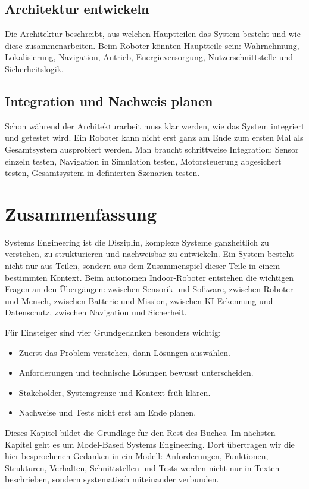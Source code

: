 \subsection{Architektur entwickeln}
Die Architektur beschreibt, aus welchen Hauptteilen das System besteht und wie diese zusammenarbeiten. Beim Roboter könnten Hauptteile sein: Wahrnehmung, Lokalisierung, Navigation, Antrieb, Energieversorgung, Nutzerschnittstelle und Sicherheitslogik.

\subsection{Integration und Nachweis planen}
Schon während der Architekturarbeit muss klar werden, wie das System integriert und getestet wird. Ein Roboter kann nicht erst ganz am Ende zum ersten Mal als Gesamtsystem ausprobiert werden. Man braucht schrittweise Integration: Sensor einzeln testen, Navigation in Simulation testen, Motorsteuerung abgesichert testen, Gesamtsystem in definierten Szenarien testen.

\section{Zusammenfassung}
Systems Engineering ist die Disziplin, komplexe Systeme ganzheitlich zu verstehen, zu strukturieren und nachweisbar zu entwickeln. Ein System besteht nicht nur aus Teilen, sondern aus dem Zusammenspiel dieser Teile in einem bestimmten Kontext. Beim autonomen Indoor-Roboter entstehen die wichtigen Fragen an den Übergängen: zwischen Sensorik und Software, zwischen Roboter und Mensch, zwischen Batterie und Mission, zwischen KI-Erkennung und Datenschutz, zwischen Navigation und Sicherheit.

Für Einsteiger sind vier Grundgedanken besonders wichtig:

\begin{itemize}
    \item Zuerst das Problem verstehen, dann Lösungen auswählen.
    \item Anforderungen und technische Lösungen bewusst unterscheiden.
    \item Stakeholder, Systemgrenze und Kontext früh klären.
    \item Nachweise und Tests nicht erst am Ende planen.
\end{itemize}

Dieses Kapitel bildet die Grundlage für den Rest des Buches. Im nächsten Kapitel geht es um Model-Based Systems Engineering. Dort übertragen wir die hier besprochenen Gedanken in ein Modell: Anforderungen, Funktionen, Strukturen, Verhalten, Schnittstellen und Tests werden nicht nur in Texten beschrieben, sondern systematisch miteinander verbunden.

